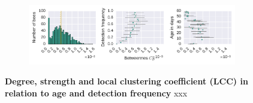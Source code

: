 \begin{figure}[!htb]
\begin{subfigure}[b]{1.0\textwidth}
	\end{subfigure}
	\begin{subfigure}[b]{1.0\textwidth}
	\centering
	\includegraphics[width=1.0\textwidth]{Figures/n3-stat-betweenAgeDetF.pdf}
	\end{subfigure}
	\caption[Degree, strength and local clustering coefficient (LCC)]{\textbf{Degree, strength and local clustering coefficient (LCC) in relation to age and detection frequency} xxx}
	\label{fig:n3-degreeStrLCC}
\end{figure}